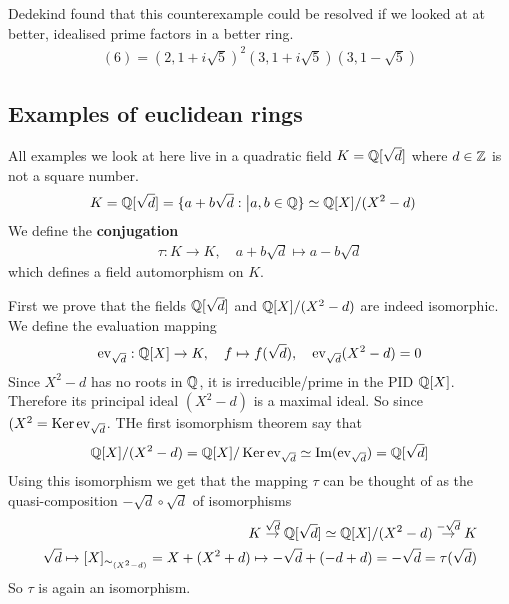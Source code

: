 Dedekind found that this counterexample could be resolved if we looked at at better, idealised prime factors in a better ring.
\begin{align*}
	(6) = (2, 1 + i \sqrt{5})^2 (3, 1 + i \sqrt{5}) (3, 1 - \sqrt{5})
\end{align*}


\subsection{Examples of euclidean rings}
All examples we look at here live in a quadratic field $K = \mathbb{Q}[\sqrt{d}]$ where $d \in \mathbb{Z}$ is not a square number.
\begin{align*}
	K &= \mathbb{Q}[\sqrt{d}] = \{a + b \sqrt{d}: \big\vert a,b \in \mathbb{Q}\} \simeq \mathbb{Q}[X]/(X^2-d)
\end{align*}
We define the \textbf{conjugation} 
\begin{align*}
	\tau: K \to K, \quad a + b \sqrt{d} \mapsto a - b \sqrt{d}
\end{align*}
which defines a field automorphism on $K$.

First we prove that the fields $\mathbb{Q}[\sqrt{d}]$ and $\mathbb{Q}[X]/(X^2 - d)$ are indeed isomorphic. We define the evaluation mapping
\begin{align*}
	\operatorname{ev}_{\sqrt{d}}: \mathbb{Q}[X] \to K, \quad f \mapsto f(\sqrt{d}), \quad \operatorname{ev}_{\sqrt{d}}(X^2 - d) = 0
\end{align*}
Since $X^2 - d$ has no roots in $\mathbb{Q}$, it is irreducible/prime in the PID $\mathbb{Q}[X]$. Therefore its principal ideal $(X^2 - d)$ is a maximal ideal. So since $(X^2 = \operatorname{Ker} \operatorname{ev}_{\sqrt{d}}$. THe first isomorphism theorem say that
\begin{align*}
	\mathbb{Q}[X]/(X^2 - d) = \mathbb{Q}[X]/\operatorname{Ker} \operatorname{ev}_{\sqrt{d}} \simeq \operatorname{Im}(\operatorname{ev}_{\sqrt{d}}) = \mathbb{Q}[\sqrt{d}] 
\end{align*}
Using this isomorphism we get that the mapping $\tau$ can be thought of as the quasi-composition $-\sqrt{d} \circ \sqrt{d}$ of isomorphisms
\begin{align*}
	K \stackrel{\sqrt{d}}{\to} \mathbb{Q}[\sqrt{d}] \simeq \mathbb{Q}[X]/(X^2 - d) \stackrel{-\sqrt{d}}{\to} K\\
	\sqrt{d} \mapsto [X]_{\sim_{(X^2 - d)}} = X + (X^2 + d) \mapsto -\sqrt{d} + (-d + d) = -\sqrt{d} = \tau(\sqrt{d})
\end{align*}
So $\tau$ is again an isomorphism.

